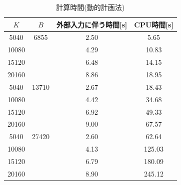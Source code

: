 \documentclass{jarticle}
\begin{document}
\begin{table}[htbp]
  \centering
  \caption{計算時間(動的計画法)}
  \label{table:time_dp}
  \begin{tabular}{cccc}
    \hline
    $K$ &  $B$ & 外部入力に伴う時間[s] & CPU時間[s]\\
    \hline \hline
    5040 & 6855& 2.50 & 5.65\\
    10080 & & 4.29 &10.83 \\
    15120 &  & 6.48 & 14.15\\
    20160 &  & 8.86 & 18.95\\
    5040 & 13710& 2.67 & 18.43\\
    10080 & & 4.42 &34.68 \\
    15120 & & 6.92 & 49.33\\
    20160 & & 9.00 & 67.57\\
     5040 & 27420& 2.60 & 62.64\\
    10080 & & 4.13 &125.03 \\
    15120 & & 6.79 & 180.09\\
    20160 & & 8.90 & 245.12\\
    \hline
  \end{tabular}
\end{table}
\end{document}
